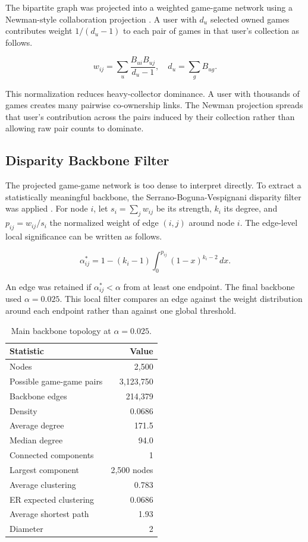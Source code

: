 \documentclass[10pt,twocolumn]{article}
\begin{document}
The bipartite graph was projected into a weighted game-game network using a Newman-style collaboration projection \cite{newman2001}. A user with $d_u$ selected owned games contributes weight $1/(d_u-1)$ to each pair of games in that user's collection as follows.

\begin{equation}
w_{ij} = \sum_{u} \frac{B_{ui}B_{uj}}{d_u - 1},
\quad d_u = \sum_g B_{ug}.
\end{equation}

This normalization reduces heavy-collector dominance. A user with thousands of games creates many pairwise co-ownership links. The Newman projection spreads that user's contribution across the pairs induced by their collection rather than allowing raw pair counts to dominate.

\subsection{Disparity Backbone Filter}

The projected game-game network is too dense to interpret directly. To extract a statistically meaningful backbone, the Serrano-Boguna-Vespignani disparity filter was applied \cite{serrano2009}. For node $i$, let $s_i=\sum_j w_{ij}$ be its strength, $k_i$ its degree, and $p_{ij}=w_{ij}/s_i$ the normalized weight of edge $(i,j)$ around node $i$. The edge-level local significance can be written as follows.

\begin{equation}
\alpha^*_{ij} = 1 - (k_i-1)\int_0^{p_{ij}} (1-x)^{k_i-2}\,dx.
\end{equation}

An edge was retained if $\alpha^*_{ij}<\alpha$ from at least one endpoint. The final backbone used $\alpha=0.025$. This local filter compares an edge against the weight distribution around each endpoint rather than against one global threshold.

\begin{table}[!htbp]
\centering
\caption{Main backbone topology at $\alpha=0.025$.}
\label{tab:topology}
\begin{tabular}{lr}
\toprule
Statistic & Value \\
\midrule
Nodes & 2,500 \\
Possible game-game pairs & 3,123,750 \\
Backbone edges & 214,379 \\
Density & 0.0686 \\
Average degree & 171.5 \\
Median degree & 94.0 \\
Connected components & 1 \\
Largest component & 2,500 nodes \\
Average clustering & 0.783 \\
ER expected clustering & 0.0686 \\
Average shortest path & 1.93 \\
Diameter & 2 \\
\bottomrule
\end{tabular}
\end{table}
\end{document}
